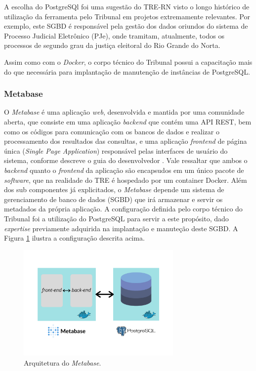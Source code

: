 A escolha do PostgreSQl foi uma sugestão do TRE-RN visto o longo histórico de utilização da ferramenta pelo Tribunal em projetos extremamente relevantes. Por exemplo, este SGBD é responsável pela gestão dos dados oriundos do sistema de Processo Judicial Eletrônico (PJe), onde tramitam, atualmente, todos os processos de segundo grau da justiça eleitoral do Rio Grande do Norta.

Assim como com o \textit{Docker}, o corpo técnico do Tribunal possui a capacitação mais do que necessária para implantação de manutenção de instâncias de PostgreSQL. 

\subsubsection{Metabase}

O \textit{Metabase} é uma aplicação \textit{web}, desenvolvida e mantida por uma comunidade aberta, que consiste em uma aplicação \textit{backend} que contém uma API REST, bem como os códigos para comunicação com os bancos de dados e realizar o processamento dos resultados das consultas, e uma aplicação \textit{frontend} de página única (\textit{Single Page Application}) responsável pelas interfaces de usuário do sistema, conforme descreve o guia do desenvolvedor \cite{metabaseeevguide}. Vale ressaltar que ambos o \textit{backend} quanto o \textit{frontend} da aplicação são encapsudos em um único pacote de \textit{software}, que na realidade do TRE é hospedado por um container Docker.
Além dos sub componentes já explicitados, o \textit{Metabase} depende um sistema de gerenciamento de banco de dados (SGBD) que irá armazenar e servir os metadados da própria aplicação. A configuração definida pelo corpo técnico do Tribunal foi a utilização do PostgreSQL para servir a este propósito, dado \textit{expertise} previamente adquirida na implantação e manuteção deste SGBD. A Figura \ref{fig:arq_metabase} ilustra a configuração descrita acima. 

\begin{figure}[htp]
   \centering
    \includegraphics[width=8cm]{Imagens/Arq_Metabase}
    \caption{Arquitetura do \textit{Metabase}.}
    \label{fig:arq_metabase}
\end{figure} 


